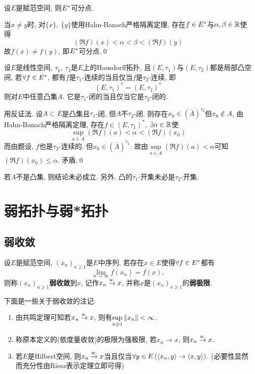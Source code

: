 	\begin{Corollary}
	设$ E $是赋范空间, 则$ E^{*} $可分点.
	\end{Corollary}
	\begin{Proof}
	当$ x\ne y $时, 对$ \{x\},\ \{y\} $使用Hahn-Banach严格隔离定理, 存在$ f\in E^{*} $与$ \alpha,\beta\in\mathbb{R} $使得
	\[
	(\Re f)(x)<\alpha<\beta<(\Re f)(y)
	\]
	故$ f(x)\ne f(y) $, 即$ E^{*} $可分点.\qed
	\end{Proof}
	
	\begin{Corollary}[Mazur]
	设$ E $是线性空间, $ \tau_1,\ \tau_2 $是$ E $上的Hausdorff拓扑, 且$ (E,\tau_1) $与$ (E,\tau_2) $都是局部凸空间, 若$ \forall f\in E^{*} $, 都有$ f $是$ \tau_1 $-连续的当且仅当$ f $是$ \tau_2 $-连续, 即
	\[
	(E,\tau_1)^*=(E,\tau_2)^*
	\]
	则对$ E $中任意凸集$ A $. 它是$ \tau_1 $-闭的当且仅当它是$ \tau_2 $-闭的.
	\end{Corollary}
	\begin{Proof}
	用反证法. 设$ A\subset E $是凸集且$ \tau_1 $-闭, 但$ A $不$ \tau_2 $-闭. 则存在$ x_0\in(\bar{A})^{\tau_2} $但$ x_0\notin A $, 由Hahn-Banach严格隔离定理, 存在$ f\in(E,\tau_1)^* $, $ \exists\alpha\in\mathbb{R} $使
	\[
	\sup_{a\in A}(\Re f)(a)<\alpha<(\Re f)(x_0)
	\]
	而由题设, $ f $也是$ \tau_2 $-连续的. 但$ x_0\in(\bar{A})^{\tau_2} $. 故由$ \sup\limits_{a\in A}(\Re f)(a)<\alpha $可知$ (\Re f)(x_0)\leqslant\alpha $. 矛盾.\qed
	\end{Proof}
	\begin{Remark}
	若$ A $不是凸集, 则结论未必成立. 另外, 凸的$ \tau_1 $-开集未必是$ \tau_2 $-开集.
	\end{Remark}
	
\section{弱拓扑与弱*拓扑}	
	\subsection{弱收敛}
	
	\begin{Definition}[弱收敛]
	设$ E $是赋范空间, $ (x_n)_{n\geqslant 1} $是$ E $中序列. 若存在$ x\in E $使得$ \forall f\in E^{*} $都有
	\[
	\lim_{n\to\infty}f(x_n)=f(x),
	\]
	则称$ (x_n)_{n\geqslant 1} $\textbf{弱收敛}到$ x $, 记作$ x_n\overset{\mathrm{w.}}{\to} x $, 并称$ x $是$ (x_n)_{n\geqslant 1} $的\textbf{弱极限}.
	\end{Definition}
	
	\begin{Remark}
	下面是一些关于弱收敛的注记:
	\begin{enumerate}[(1)]
	\item 由共鸣定理可知若$ x_n\overset{\mathrm{w.}}{\to} x $, 则有$ \sup\limits_{n\geqslant 1}\left\| x_n \right\|<\infty $.
	\item 称原本定义的(依度量收敛)的极限为强极限, 若$ x_n\to x $, 则$ x_n\overset{\mathrm{w.}}{\to} x $.
	\item 若$ E $是Hilbert空间, 则$ x_n\overset{\mathrm{w.}}{\to} x $当且仅当$ \forall y\in E\,(\left\langle x_n,y \right\rangle\to\left\langle x,y \right\rangle) $. (必要性显然而充分性由Riesz表示定理立即可得)
	\end{enumerate}
	\end{Remark}
	
	
	
	
	
	
	